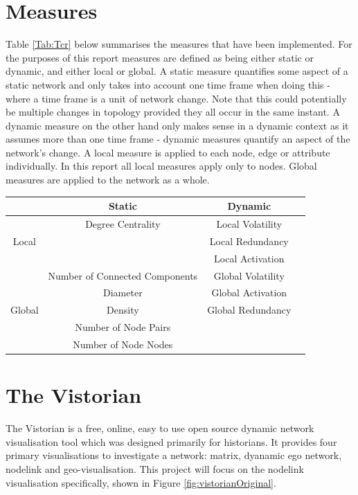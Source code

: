 \section{Measures}
Table \ref{Tab:Tcr} below summarises the measures that have been implemented. For the purposes of this report measures are defined as being either static or dynamic, and either local or global. A static measure quantifies some aspect of a static network and only takes into account one time frame when doing this - where a time frame is a unit of network change. Note that this could potentially be multiple changes in topology provided they all occur in the same instant. A dynamic measure on the other hand only makes sense in a dynamic context as it assumes more than one time frame - dynamic measures quantify an aspect of the network's change. A local measure is applied to each node, edge or attribute individually. In this report all local measures apply only to nodes. Global measures are applied to the network as a whole.

\begin{center}
\begin{table}[H]
\begin{tabular}{ |c|c|c|c| } 
\hline
 & Static & Dynamic \\
\hline
\multirow{3}{4em}{Local} & Degree Centrality & Local Volatility \\ 
& & Local Redundancy \\ 
& & Local Activation \\ 
\hline
\multirow{5}{4em}{Global} & Number of Connected Components & Global Volatility \\
 & Diameter & Global Activation \\
 & Density & Global Redundancy  \\
 & Number of Node Pairs &   \\
 & Number of Node Nodes &   \\
\hline
\end{tabular}

\end{table}
\end{center}



\section{The Vistorian}
The Vistorian is a free, online, easy to use open source dynamic network visualisation tool which was designed primarily for historians. It provides four primary visualisations to investigate a network: matrix, dyanamic ego network, nodelink and geo-visualisation. This project will focus on the nodelink visualisation specifically, shown in Figure \ref{fig:vistorianOriginal}. 

